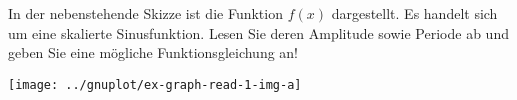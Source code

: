 \item 

\begin{multicols}{2}

In der nebenstehende Skizze ist die Funktion $f(x)$ dargestellt. Es handelt sich um eine skalierte Sinusfunktion. Lesen Sie deren Amplitude sowie Periode ab und geben Sie eine mögliche Funktionsgleichung an!

\columnbreak

\texttt{[image: ../gnuplot/ex-graph-read-1-img-a]}

\end{multicols}


